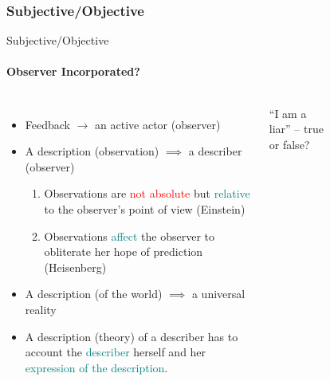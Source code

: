 \documentclass[
	11pt,
	aspectratio=169,
]{beamer}
\begin{document}
            \subsubsection{Subjective/Objective}
                \begin{frame}{Subjective/Objective}
                    \framesubtitle{Observer Incorporated? \cite{vonFoerster_2003}}
                    \begin{columns}
                            \begin{itemize}
                                \item<1-> Feedback $\longrightarrow$ an active actor (observer)
                                \item<2-> A description (observation) $\implies$ a describer (observer)
                                    \begin{enumerate}
                                        \item Observations are \textcolor{red}{not absolute} but \textcolor{teal}{relative} to the observer's point of view (Einstein)
                                        \item Observations \textcolor{teal}{affect} the observer to obliterate her hope of prediction (Heisenberg)
                                    \end{enumerate}
                                \item<3-> A description (of the world) $\implies$ a universal reality
                                \item<4-> A description (theory) of a describer has to account the \textcolor{teal}{describer} herself and her \textcolor{teal}{expression of the description}.
                            \end{itemize}
                            ``I am a liar'' -- true or false? \\
                            \begin{figure}

\end{figure}
\end{columns}
\end{frame}
\end{document}
